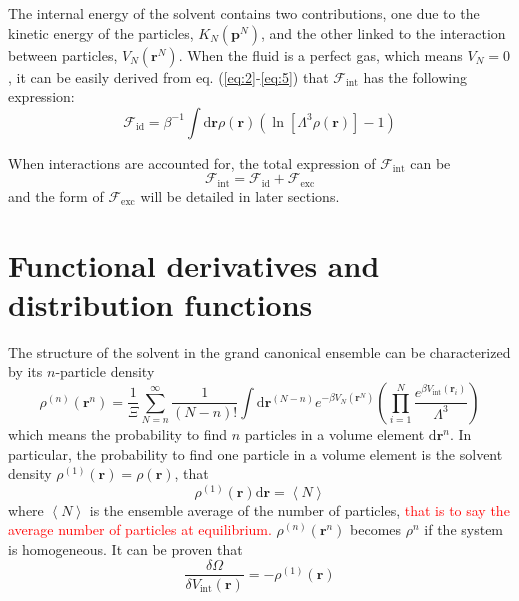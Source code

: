 The internal energy of the solvent contains two contributions, one
due to the kinetic energy of the particles, $K_{N}(\mathbf{p}^{N})$,
and the other linked to the interaction between particles, $V_{N}(\mathbf{r}^{N})$.
When the fluid is a perfect gas, which means $V_{N}=0$, it can be
easily derived from eq. (\ref{eq:2}-\ref{eq:5}) that $\mathcal{F}_{\mathrm{int}}$
has the following expression:
\begin{equation}
\mathcal{F}_{\mathrm{id}}=\beta^{-1}\int\mathrm{d}\mathbf{r}\rho(\mathbf{r})\left(\ln\left[\Lambda^{3}\rho(\mathbf{r})\right]-1\right)
\end{equation}

When interactions are accounted for, the total expression of $\mathcal{F}_{\mathrm{int}}$
can be
\begin{equation}
\mathcal{F}_{\mathrm{int}}=\mathcal{F}_{\mathrm{id}}+\mathcal{F}_{\mathrm{exc}}\label{eq:f-int-def}
\end{equation}
and the form of $\mathcal{F}_{\mathrm{exc}}$ will be detailed in
later sections.

\section{Functional derivatives and distribution functions}

The structure of the solvent in the grand canonical ensemble can be
characterized by its $n$-particle density 
\begin{equation}
\rho^{(n)}(\mathbf{r}^{n})=\dfrac{1}{\Xi}\sum_{N=n}^{\infty}\dfrac{1}{(N-n)!}\int\mathrm{d}\mathbf{r}^{\left(N-n\right)}e^{-\beta V_{N}(\mathbf{r}^{N})}\left(\prod_{i=1}^{N}\frac{e^{\beta V_{\mathrm{int}}(\mathbf{r}_{i})}}{\Lambda^{3}}\right)\label{eq:def-rho}
\end{equation}
which means the probability to find $n$ particles in a volume element
$\mathrm{d}\mathbf{r}^{n}$. In particular, the probability to find
one particle in a volume element is the solvent density $\rho^{(1)}(\mathbf{r})=\rho(\mathbf{r})$,
that 
\begin{equation}
\rho^{(1)}(\mathbf{r})\mathrm{d}\mathbf{r}=\left\langle N\right\rangle 
\end{equation}
where $\left\langle N\right\rangle $ is the ensemble average of the
number of particles, \textcolor{red}{that is to say the average number
of particles at equilibrium.} $\rho^{(n)}(\mathbf{r}^{n})$ becomes
$\rho^{n}$ if the system is homogeneous. It can be proven that
\begin{equation}
\dfrac{\delta\Omega}{\delta V_{\mathrm{int}}(\mathbf{r})}=-\rho^{(1)}(\mathbf{r})
\end{equation}

